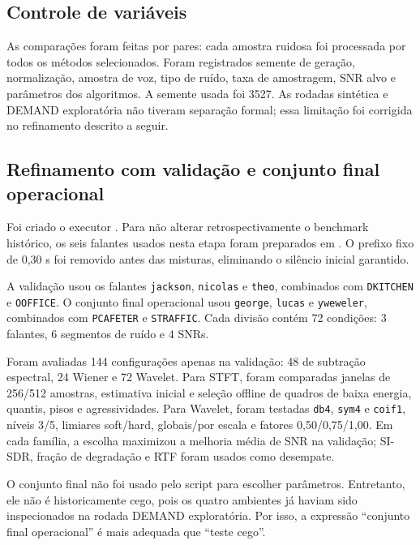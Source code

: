 \subsection{Controle de variáveis}

As comparações foram feitas por pares: cada amostra ruidosa foi processada por todos os métodos selecionados. Foram registrados semente de geração, normalização, amostra de voz, tipo de ruído, taxa de amostragem, SNR alvo e parâmetros dos algoritmos. A semente usada foi 3527. As rodadas sintética e DEMAND exploratória não tiveram separação formal; essa limitação foi corrigida no refinamento descrito a seguir.

\subsection{Refinamento com validação e conjunto final operacional}

Foi criado o executor . Para não alterar retrospectivamente o benchmark histórico, os seis falantes usados nesta etapa foram preparados em . O prefixo fixo de 0,30 s foi removido antes das misturas, eliminando o silêncio inicial garantido.

A validação usou os falantes \texttt{jackson}, \texttt{nicolas} e \texttt{theo}, combinados com \texttt{DKITCHEN} e \texttt{OOFFICE}. O conjunto final operacional usou \texttt{george}, \texttt{lucas} e \texttt{yweweler}, combinados com \texttt{PCAFETER} e \texttt{STRAFFIC}. Cada divisão contém 72 condições: 3 falantes, 6 segmentos de ruído e 4 SNRs.

Foram avaliadas 144 configurações apenas na validação: 48 de subtração espectral, 24 Wiener e 72 Wavelet. Para STFT, foram comparadas janelas de 256/512 amostras, estimativa inicial e seleção offline de quadros de baixa energia, quantis, pisos e agressividades. Para Wavelet, foram testadas \texttt{db4}, \texttt{sym4} e \texttt{coif1}, níveis 3/5, limiares soft/hard, globais/por escala e fatores 0,50/0,75/1,00. Em cada família, a escolha maximizou a melhoria média de SNR na validação; SI-SDR, fração de degradação e RTF foram usados como desempate.

O conjunto final não foi usado pelo script para escolher parâmetros. Entretanto, ele não é historicamente cego, pois os quatro ambientes já haviam sido inspecionados na rodada DEMAND exploratória. Por isso, a expressão ``conjunto final operacional'' é mais adequada que ``teste cego''.

